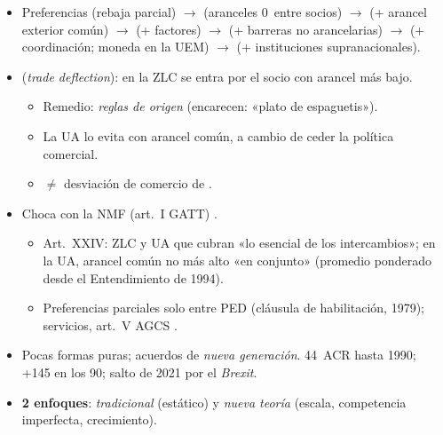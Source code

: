 \documentclass{article}
\begin{document}
\begin{columnas}
\begin{itemize}
\item Preferencias (rebaja parcial) $\to$  (aranceles 0~entre socios) $\to$  (+ arancel exterior común) $\to$  (+ factores) $\to$  (+ barreras no arancelarias) $\to$  (+ coordinación; moneda en la UEM) $\to$  (+ instituciones supranacionales).
\item {} (\emph{trade deflection}): en la ZLC se entra por el socio con arancel más bajo.
  \begin{itemize}
  \item Remedio: \emph{reglas de origen} (encarecen: «plato de espaguetis»).
  \item La UA lo evita con arancel común, a cambio de ceder la política comercial.
  \item $\neq$ desviación de comercio de .
  \end{itemize}
\end{itemize}
\begin{itemize}
\item Choca con la NMF (art.~I GATT) .
  \begin{itemize}
  \item Art.~XXIV: ZLC y UA que cubran «lo esencial de los intercambios»; en la UA, arancel común no más alto «en conjunto» (promedio ponderado desde el Entendimiento de 1994).
  \item Preferencias parciales solo entre PED (cláusula de habilitación, 1979); servicios, art.~V AGCS .
  \end{itemize}
\item Pocas formas puras; acuerdos de \emph{nueva generación}. 44~ACR hasta 1990; +145 en los 90; salto de 2021 por el \emph{Brexit}.
\end{itemize}
\begin{itemize}
\item \textbf{2 enfoques}: \emph{tradicional} (estático) y \emph{nueva teoría} (escala, competencia imperfecta, crecimiento).
\end{itemize}


\end{columnas}
\end{document}
